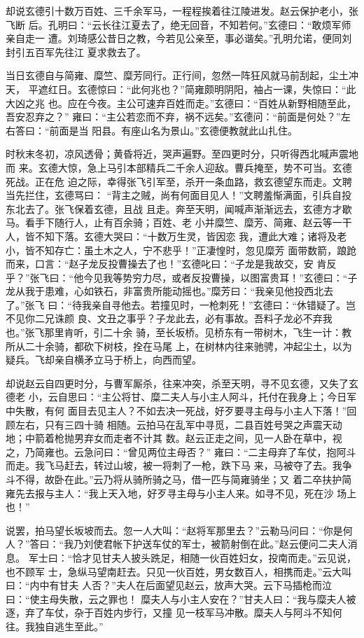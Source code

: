 却说玄德引十数万百姓、三千余军马，一程程挨着往江陵进发。赵云保护老小，张飞断
后。孔明曰：“云长往江夏去了，绝无回音，不知若何。”玄德曰：“敢烦军师亲自走一
遭。刘琦感公昔日之教，今若见公亲至，事必谐矣。”孔明允诺，便同刘封引五百军先往江
夏求救去了。

当日玄德自与简雍、糜竺、糜芳同行。正行间，忽然一阵狂风就马前刮起，尘土冲天，
平遮红日。玄德惊曰：“此何兆也？”简雍颇明阴阳，袖占一课，失惊曰：“此大凶之兆
也。应在今夜。主公可速弃百姓而走。”玄德曰：“百姓从新野相随至此，吾安忍弃之？”
雍曰：“主公若恋而不弃，祸不远矣。”玄德问：“前面是何处？”左右答曰：“前面是当
阳县。有座山名为景山。”玄德便教就此山扎住。

时秋末冬初，凉风透骨；黄昏将近，哭声遍野。至四更时分，只听得西北喊声震地而
来。玄德大惊，急上马引本部精兵二千余人迎敌。曹兵掩至，势不可当。玄德死战。正在危
迫之际，幸得张飞引军至，杀开一条血路，救玄德望东而走。文聘当先拦住，玄德骂曰：
“背主之贼，尚有何面目见人！”文聘羞惭满面，引兵自投东北去了。张飞保着玄德，且战
且走。奔至天明，闻喊声渐渐远去，玄德方才歇马。看手下随行人，止有百余骑；百姓、老
小并糜竺、糜芳、简雍、赵云等一干人，皆不知下落。玄德大哭曰：“十数万生灵，皆因恋
我，遭此大难；诸将及老小，皆不知存亡：虽土木之人，宁不悲乎！”正凄惶时，忽见糜芳
面带数箭，踉跄而来，口言：“赵子龙反投曹操去了也！”玄德叱曰：“子龙是我故交，安
肯反乎？”张飞曰：“他今见我等势穷力尽，或者反投曹操，以图富贵耳！”玄德曰：“子
龙从我于患难，心如铁石，非富贵所能动摇也。”糜芳曰：“我亲见他投西北去了。”张飞
曰：“待我亲自寻他去。若撞见时，一枪刺死！”玄德曰：“休错疑了。岂不见你二兄诛颜
良、文丑之事乎？子龙此去，必有事故。吾料子龙必不弃我也。”张飞那里肯听，引二十余
骑，至长坂桥。见桥东有一带树木，飞生一计：教所从二十余骑，都砍下树枝，拴在马尾
上，在树林内往来驰骋，冲起尘土，以为疑兵。飞却亲自横矛立马于桥上，向西而望。

却说赵云自四更时分，与曹军厮杀，往来冲突，杀至天明，寻不见玄德，又失了玄德老
小，云自思曰：“主公将甘、糜二夫人与小主人阿斗，托付在我身上；今日军中失散，有何
面目去见主人？不如去决一死战，好歹要寻主母与小主人下落！”回顾左右，只有三四十骑
相随。云拍马在乱军中寻觅，二县百姓号哭之声震天动地；中箭着枪抛男弃女而走者不计其
数。赵云正走之间，见一人卧在草中，视之，乃简雍也。云急问曰：“曾见两位主母否？”
雍曰：“二主母弃了车仗，抱阿斗而走。我飞马赶去，转过山坡，被一将刺了一枪，跌下马
来，马被夺了去。我争斗不得，故卧在此。”云乃将从骑所骑之马，借一匹与简雍骑坐；又
着二卒扶护简雍先去报与主人：“我上天入地，好歹寻主母与小主人来。如寻不见，死在沙
场上也！”

说罢，拍马望长坂坡而去。忽一人大叫：“赵将军那里去？”云勒马问曰：“你是何
人？”答曰：“我乃刘使君帐下护送车仗的军士，被箭射倒在此。”赵云便问二夫人消息。
军士曰：“恰才见甘夫人披头跣足，相随一伙百姓妇女，投南而走。”云见说，也不顾军
士，急纵马望南赶去。只见一伙百姓，男女数百人，相携而走。”云大叫曰：“内中有甘夫
人否？”夫人在后面望见赵云，放声大哭。云下马插枪而泣曰：“使主母失散，云之罪也！
糜夫人与小主人安在？”甘夫人曰：“我与糜夫人被逐，弃了车仗，杂于百姓内步行，又撞
见一枝军马冲散。糜夫人与阿斗不知何往。我独自逃生至此。”

